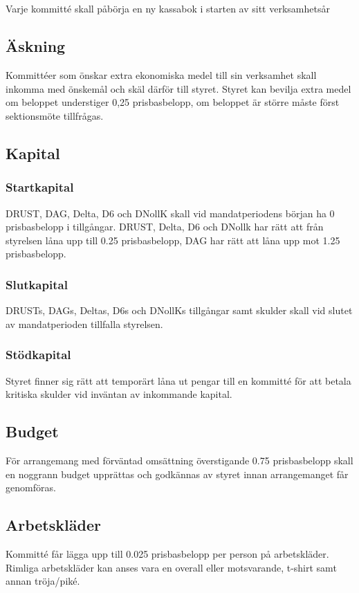 \documentclass[a4paper, 10pt]{article}
\begin{document}
\subsection{}
Varje kommitté skall påbörja en ny kassabok i starten av sitt verksamhetsår
\subsection{Äskning}
Kommittéer som önskar extra ekonomiska medel till sin verksamhet skall inkomma med önskemål och skäl därför till styret. Styret kan bevilja extra medel om beloppet understiger 0,25 prisbasbelopp, om beloppet är större måste först sektionsmöte tillfrågas.
\subsection{Kapital}
\label{sec:sektionsforeningar_startkapital}
\subsubsection{Startkapital}
DRUST, DAG, Delta, D6 och DNollK skall vid mandatperiodens början ha 0 prisbasbelopp
i tillgångar. DRUST, Delta, D6 och DNollk har rätt att från styrelsen låna
upp till 0.25 prisbasbelopp, DAG har rätt att låna upp mot 1.25 prisbasbelopp.
\subsubsection{Slutkapital}
DRUSTs, DAGs, Deltas, D6s och DNollKs tillgångar samt skulder skall vid slutet av mandatperioden tillfalla styrelsen.
\subsubsection{Stödkapital}
Styret finner sig rätt att temporärt låna ut
pengar till en kommitté för att betala kritiska skulder vid inväntan av inkommande
kapital.
\subsection{Budget}
För arrangemang med förväntad omsättning överstigande 0.75 prisbasbelopp skall en noggrann budget upprättas och godkännas av styret innan arrangemanget får genomföras.
\subsection{Arbetskläder}
Kommitté får lägga upp till 0.025 prisbasbelopp per person på arbetskläder. Rimliga arbetskläder kan anses vara en overall eller motsvarande, t-shirt samt annan
tröja/piké.
\end{document}
